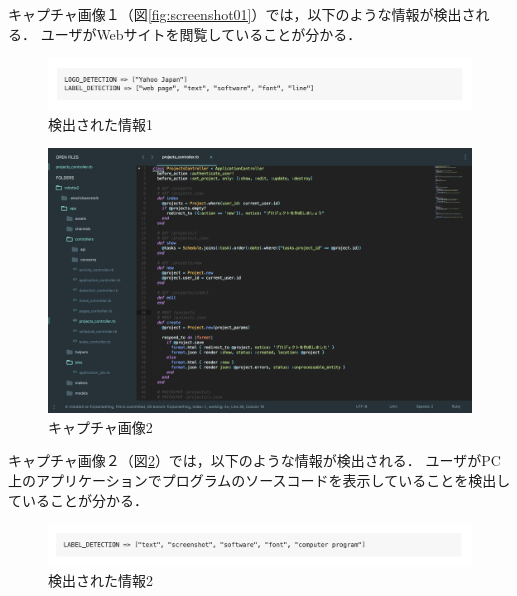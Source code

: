 キャプチャ画像１（図\ref{fig:screenshot01}）では，以下のような情報が検出される．
ユーザがWebサイトを閲覧していることが分かる．

\begin{figure}[h]
  \begin{center}
  \includegraphics[width=14.0cm]{graphics/response01.png}
  \caption{検出された情報1}
  \label{fig:response01}
  \end{center}
\end{figure}

\clearpage

\begin{figure}[h]
  \begin{center}
  \includegraphics[width=14.0cm]{graphics/screenshot02.png}
  \caption{キャプチャ画像2}
  \label{fig:screenshot02}
  \end{center}
\end{figure}

キャプチャ画像２（図\ref{fig:screenshot02}）では，以下のような情報が検出される．
ユーザがPC上のアプリケーションでプログラムのソースコードを表示していることを検出していることが分かる．

\begin{figure}[h]
  \begin{center}
  \includegraphics[width=14.0cm]{graphics/response02.png}
  \caption{検出された情報2}
  \label{fig:response02}
  \end{center}
\end{figure}


